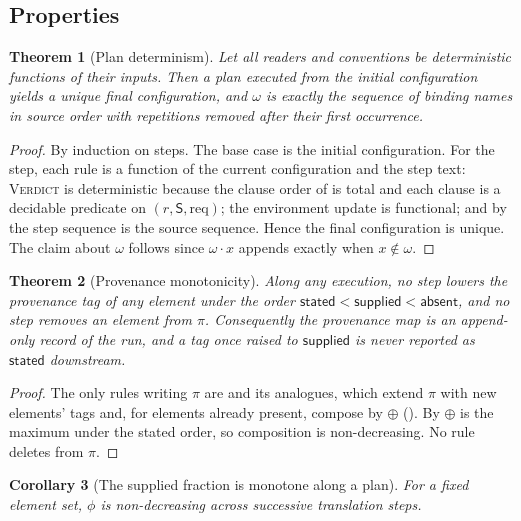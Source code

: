 \documentclass[11pt,twocolumn,a4paper]{article}
\theoremstyle{msthm}
\newtheorem{theorem}{Theorem}[section]
\newtheorem{corollary}[theorem]{Corollary}
\theoremstyle{definition}
\theoremstyle{remark}
\newcommand{\Prov}{\pi}
\newcommand{\Src}{\mathsf{S}}
\newcommand{\Req}{\mathrm{req}}
\newcommand{\Ord}{\omega}
\newcommand{\stated}{\textsf{stated}}
\newcommand{\supplied}{\textsf{supplied}}
\newcommand{\absent}{\textsf{absent}}
\begin{document}
\subsection{Properties}

\begin{theorem}[Plan determinism]
\label{thm:plan-determinism}
Let all readers and conventions be deterministic functions of their
inputs. Then a plan executed from the initial configuration yields a
unique final configuration, and $\Ord$ is exactly the sequence of
binding names in source order with repetitions removed after their first
occurrence.
\end{theorem}

\begin{proof}
By induction on steps. The base case is the initial configuration. For
the step, each rule is a function of the current configuration and the
step text: \textsc{Verdict} is deterministic because the clause order of
 is total and each clause is a decidable predicate on
$(r,\Src,\Req)$; the environment update is functional; and by
 the step sequence is the source sequence. Hence the
final configuration is unique. The claim about $\Ord$ follows since
$\Ord\cdot x$ appends exactly when $x\notin\Ord$.
\end{proof}

\begin{theorem}[Provenance monotonicity]
\label{thm:prov-monotone}
Along any execution, no step lowers the provenance tag of any element
under the order $\stated<\supplied<\absent$, and no step removes an
element from $\Prov$. Consequently the provenance map is an append-only
record of the run, and a tag once raised to $\supplied$ is never
reported as $\stated$ downstream.
\end{theorem}

\begin{proof}
The only rules writing $\Prov$ are  and its
analogues, which extend $\Prov$ with new elements' tags and, for
elements already present, compose by $\oplus$ ().
By  $\oplus$ is the maximum under the stated order, so
composition is non-decreasing. No rule deletes from $\Prov$.
\end{proof}

\begin{corollary}[The supplied fraction is monotone along a plan]
\label{cor:phi-monotone}
For a fixed element set, $\phi$ is non-decreasing across successive
translation steps.
\end{corollary}
\end{document}
